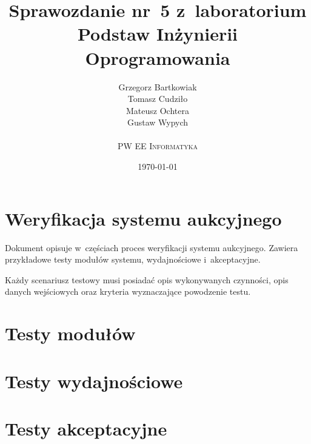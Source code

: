 \documentclass[10pt,a4paper]{article}
\begin{document}
\title{
  Sprawozdanie nr~5 z~laboratorium\\Podstaw Inżynierii Oprogramowania
}
\author{
  Grzegorz Bartkowiak\\
  Tomasz Cudziło\\
  Mateusz Ochtera\\
  Gustaw Wypych\\
  \\
  \textsc{PW EE Informatyka}\\[10pt]
}
\date{\today}
\maketitle

\section{Weryfikacja systemu aukcyjnego}

Dokument opisuje w~częściach proces weryfikacji systemu aukcyjnego. Zawiera
przykładowe testy modułów systemu, wydajnościowe i~akceptacyjne.

Każdy scenariusz testowy musi posiadać opis wykonywanych czynności, opis danych
wejściowych oraz kryteria wyznaczające powodzenie testu.

\section{Testy modułów}

\section{Testy wydajnościowe}

\section{Testy akceptacyjne}
\end{document}
